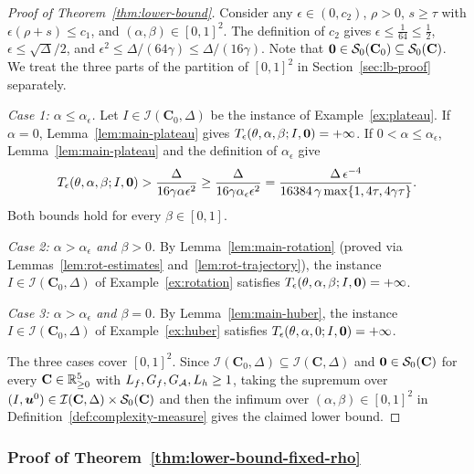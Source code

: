 \begin{proof}[Proof of Theorem~\ref{thm:lower-bound}]
Consider any \(\epsilon\in(0,c_2)\), \(\rho>0\), \(s\ge\tau\) with
\(\epsilon(\rho+s)\le c_1\), and \((\alpha,\beta)\in[0,1]^2\). The
definition of \(c_2\) gives \(\epsilon\le\frac1{64}\le\frac12\),
\(\epsilon\le\sqrt\Delta/2\), and
\(\epsilon^2\le\Delta/(64\gamma)\le\Delta/(16\gamma)\). Note that
\(\bm{0}\in\mathcal S_0(\mathbf C_0)\subseteq\mathcal S_0(\mathbf C)\). We treat
the three parts of the partition of \([0,1]^2\) in Section~\ref{sec:lb-proof}
separately.

\emph{Case 1: \(\alpha\le\alpha_\epsilon\).} Let \(I\in\mathcal I(\mathbf C_0,\Delta)\)
be the instance of Example~\ref{ex:plateau}. If \(\alpha=0\),
Lemma~\ref{lem:main-plateau} gives
\(T_\epsilon(\theta,\alpha,\beta;I,\bm{0})=+\infty\). If
\(0<\alpha\le\alpha_\epsilon\), Lemma~\ref{lem:main-plateau} and the
definition of \(\alpha_\epsilon\) give
\[
T_\epsilon(\theta,\alpha,\beta;I,\bm{0})
>\frac{\Delta}{16\gamma\alpha\epsilon^2}
\ge\frac{\Delta}{16\gamma\alpha_\epsilon\epsilon^2}
=\frac{\Delta\,\epsilon^{-4}}{16384\,\gamma\max\{1,4\tau,4\gamma\tau\}}.
\]
Both bounds hold for every \(\beta\in[0,1]\).

\emph{Case 2: \(\alpha>\alpha_\epsilon\) and \(\beta>0\).} By
Lemma~\ref{lem:main-rotation} (proved via Lemmas~\ref{lem:rot-estimates}
and~\ref{lem:rot-trajectory}), the instance \(I\in\mathcal I(\mathbf C_0,\Delta)\)
of Example~\ref{ex:rotation} satisfies
\(T_\epsilon(\theta,\alpha,\beta;I,\bm{0})=+\infty\).

\emph{Case 3: \(\alpha>\alpha_\epsilon\) and \(\beta=0\).} By
Lemma~\ref{lem:main-huber}, the instance \(I\in\mathcal I(\mathbf C_0,\Delta)\)
of Example~\ref{ex:huber} satisfies
\(T_\epsilon(\theta,\alpha,0;I,\bm{0})=+\infty\).

The three cases cover \([0,1]^2\). Since
\(\mathcal I(\mathbf C_0,\Delta)\subseteq\mathcal I(\mathbf C,\Delta)\) and
\(\bm{0}\in\mathcal S_0(\mathbf C)\) for every \(\mathbf C\in\mathbb{R}^5_{\ge0}\) with
\(L_f,G_f,G_{\mathcal{A}},L_h\ge1\), taking the supremum over
\((I,\bm{u}^0)\in\mathcal I(\mathbf C,\Delta)\times\mathcal S_0(\mathbf C)\) and
then the infimum over \((\alpha,\beta)\in[0,1]^2\) in
Definition~\ref{def:complexity-measure} gives the claimed lower bound.
\end{proof}

\subsubsection{Proof of Theorem~\ref{thm:lower-bound-fixed-rho}}
\label{subsec:lb-fixed-rho-proof}

